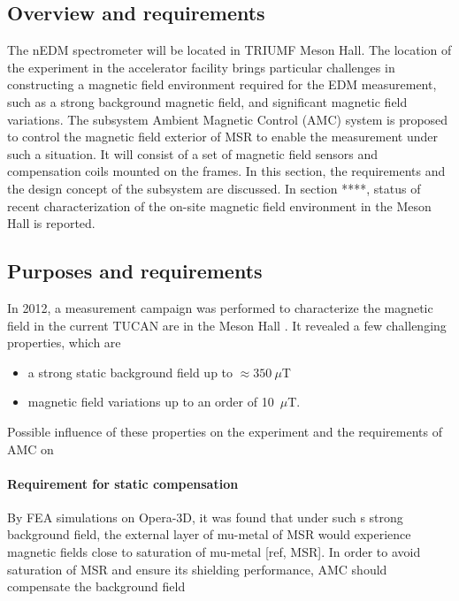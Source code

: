 \subsection{Overview and requirements}
The nEDM spectrometer will be located in TRIUMF Meson Hall. The location of the experiment in the accelerator facility brings particular challenges in constructing a magnetic field environment required for the EDM measurement, such as a strong background magnetic field, and significant magnetic field variations.  The subsystem Ambient Magnetic Control (AMC) system is proposed to control the magnetic field exterior of MSR to enable the measurement under such a situation. It will consist of a set of magnetic field sensors and compensation coils mounted on the frames.  In this section, the requirements and the design concept of the subsystem are discussed. In section ****, status of recent characterization of the on-site magnetic field environment in the Meson Hall is reported.  


 
\subsection{Purposes and requirements}
In 2012, a measurement campaign was performed to characterize the magnetic field in the current TUCAN are in the Meson Hall \cite{Sarte}. It revealed a few challenging properties, which are 
\begin{itemize}
\item a strong static background field up to $\approx 350~\mu$T
\item magnetic field variations up to an order of 10~$\mu$T.
\end{itemize}
Possible influence of these properties on the experiment and the requirements of  AMC on 
\paragraph*{Requirement for static compensation }
By FEA simulations on Opera-3D, it was found that under such s strong background field, the external layer of mu-metal of MSR would experience magnetic fields close to saturation of mu-metal [ref, MSR]. In order to avoid saturation of MSR and ensure its shielding performance,  AMC should compensate the background field 
